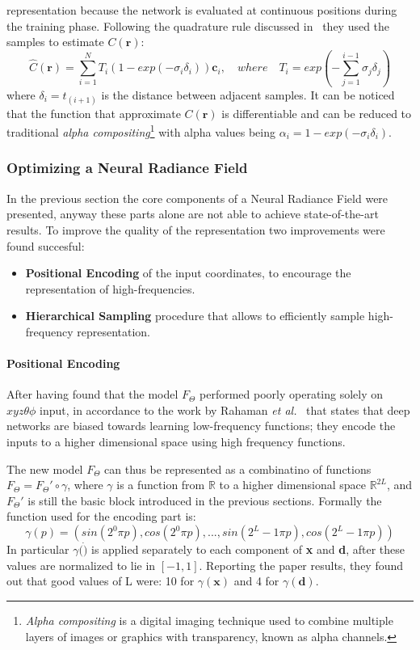 representation because the network is evaluated at continuous positions during the training phase.
Following the quadrature rule discussed in~\cite{nerf26} they used the samples to estimate $C(\textbf{r})$:
\begin{equation}\label{eq:neural_C}
    \widehat{C}(\textbf{r}) = \sum_{i=1}^N T_i (1-exp(-\sigma_i \delta_i))\textbf{c}_i, \quad where \quad T_i = exp(-\sum_{j=1}^{i-1}\sigma_j\delta_j)
\end{equation}
where $\delta_i =t_(i+1)$ is the distance between adjacent samples. It can be noticed that the function that approximate $C(\textbf{r})$ is differentiable and can be 
reduced to traditional \textit{alpha compositing}\footnote{\textit{Alpha compositing} is a digital imaging technique used to combine multiple layers of images or graphics with transparency, known as alpha channels.}
with alpha values being $\alpha_i = 1-exp(-\sigma_i \delta_i)$.

\subsubsection{Optimizing a Neural Radiance Field}
In the previous section the core components of a Neural Radiance Field were presented, anyway these parts alone are not able to 
achieve state-of-the-art results. To improve the quality of the representation two improvements were found succesful:
\begin{itemize}
    \item \textbf{Positional Encoding} of the input coordinates, to encourage the representation of high-frequencies.
    \item \textbf{Hierarchical Sampling} procedure that allows to efficiently sample high-frequency representation.
\end{itemize} 

\paragraph{Positional Encoding} After having found that the model $F_\Theta$ performed poorly operating solely on $xyz\theta\phi$ input, in accordance
to the work by Rahaman \textit{et al.}~\cite{nerf35} that states that deep networks are biased towards
learning low-frequency functions; they encode the inputs to a higher dimensional space using high frequency functions. 

The new model $F_\Theta$ can thus be represented as a combinatino of functions $F_\Theta = F_\Theta'\circ \gamma$, where $\gamma$ is a function from $\mathbb{R}$ 
to a higher dimensional space $\mathbb{R}^{2L}$, and  $F_\Theta'$ is still the basic block introduced in the previous sections.
Formally the function used for the encoding part is:
\begin{equation}
    \gamma(p) = (sin(2^0 \pi p), cos(2^0 \pi p), ...,sin(2^L-1 \pi p), cos(2^L-1 \pi p))
\end{equation}
In particular $\gamma(\dot)$ is applied  separately to each component of \textbf{x} and \textbf{d}, after these values are normalized to lie in $[-1,1]$.
Reporting the paper results, they found out that good values of L were: 10 for $\gamma(\textbf{x})$ and 4 for $\gamma(\textbf{d})$.

